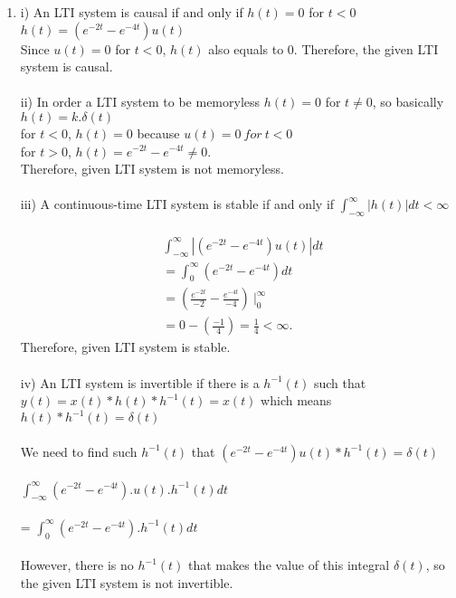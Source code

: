\documentclass[10pt,a4paper, margin=1in]{article}
\begin{document}
\begin{enumerate}
\begin{enumerate}
    \item %
    i) An LTI system is causal if and only if $h(t)=0$ for $t<0$ \\
    $h(t) = (e^{-2t} - e^{-4t})u(t)$ \\
    Since $u(t)=0$ for $t<0$, $h(t)$ also equals to 0. Therefore, the given LTI system is causal. \\ \\
    ii) In order a LTI system to be memoryless $h(t) = 0$ for $t \neq 0$, so basically $h(t) = k.\delta(t)$ \\
    for $t < 0$, $h(t) = 0$ because $u(t)=0 \ for \ t<0$ \\
    for $t > 0$, $h(t) = e^{-2t} - e^{-4t} \neq 0$. \\
    Therefore, given LTI system is not memoryless. \\ \\ 
    iii) A continuous-time LTI system is stable if
and only if $\int_{-\infty}^{\infty}|h(t)|dt < \infty$ \\ \\
	\begin{align*}
	&\int_{-\infty}^{\infty}|(e^{-2t}-e^{-4t})u(t)|dt \\
	&= \int_{0}^{\infty}(e^{-2t}-e^{-4t})dt \\
	&= (\frac{e^{-2t}}{-2} - \frac{e^{-4t}}{-4}) \ \vert_{0}^{\infty}  \\
	&= 0 - (\frac{-1}{4}) = \frac{1}{4} < \infty.
	\end{align*}
	Therefore, given LTI system is stable. \\ \\
	iv) An LTI system is invertible if there is a $h^{-1}(t)$ such that $y(t) = x(t)*h(t)*h^{-1}(t) = x(t)$ which means $h(t)*h^{-1}(t) =  \delta(t)$ \\ \\
	We need to find such $h^{-1}(t)$ that $(e^{-2t}-e^{-4t})u(t)*h^{-1}(t) = \delta(t)$ \\ \\
	$\int_{-\infty}^{\infty}(e^{-2t}-e^{-4t}).u(t).h^{-1}(t)dt$ \\ \\
	= $\int_{0}^{\infty}(e^{-2t}-e^{-4t}).h^{-1}(t)dt$ \\ \\
	However, there is no $h^{-1}(t)$ that makes the value of this integral $\delta(t)$, so the given LTI system is not invertible. \\
    \end{enumerate}

\end{enumerate}
\end{document}
